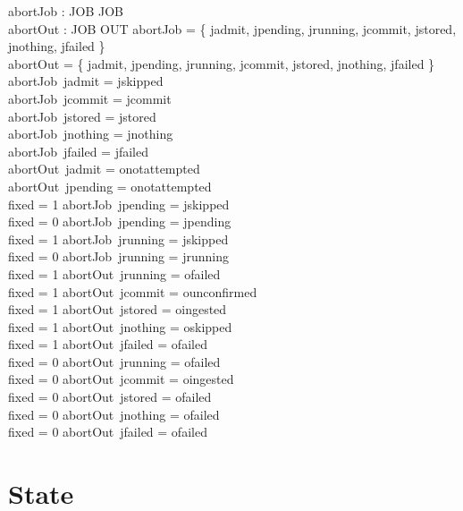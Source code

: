 \documentclass[a4paper,10pt,fleqn]{article}
\begin{document}
\begin{axdef}
abortJob : JOB \pfun JOB \\
abortOut : JOB \pfun OUT
\where
\dom abortJob = \{ jadmit, jpending, jrunning, jcommit, jstored, jnothing, jfailed \} \\
\dom abortOut = \{ jadmit, jpending, jrunning, jcommit, jstored, jnothing, jfailed \} \\
abortJob~jadmit = jskipped \\
abortJob~jcommit = jcommit \\
abortJob~jstored = jstored \\
abortJob~jnothing = jnothing \\
abortJob~jfailed = jfailed \\
abortOut~jadmit = onotattempted \\
abortOut~jpending = onotattempted \\
fixed = 1 \implies abortJob~jpending = jskipped \\
fixed = 0 \implies abortJob~jpending = jpending \\
fixed = 1 \implies abortJob~jrunning = jskipped \\
fixed = 0 \implies abortJob~jrunning = jrunning \\
fixed = 1 \implies abortOut~jrunning = ofailed \\
fixed = 1 \implies abortOut~jcommit = ounconfirmed \\
fixed = 1 \implies abortOut~jstored = oingested \\
fixed = 1 \implies abortOut~jnothing = oskipped \\
fixed = 1 \implies abortOut~jfailed = ofailed \\
fixed = 0 \implies abortOut~jrunning = ofailed \\
fixed = 0 \implies abortOut~jcommit = oingested \\
fixed = 0 \implies abortOut~jstored = ofailed \\
fixed = 0 \implies abortOut~jnothing = ofailed \\
fixed = 0 \implies abortOut~jfailed = ofailed
\end{axdef}

\section{State}
\label{sec:state}
\end{document}
